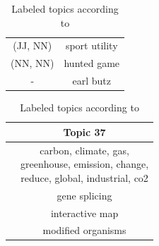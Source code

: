 {\begin{table}
\begin{minipage}[t]{0.5\textwidth}
\begin{tabular}{c|c}
			\hline
			(JJ, NN) & sport utility \\
			(NN, NN) & hunted game   \\
			-& earl butz	\\
		\end{tabular}
	\end{minipage}
	\hfill\hfill
	\begin{minipage}[t]{0.5\textwidth}
		\begin{tabular}{c|c}
			&Topic 37\\
			\hline
			\hline
			& \thead{carbon, climate, gas,\\ 	greenhouse, emission, change,\\ 	reduce, 	global, 	industrial, 	co2} \\
			\hline
			& gene splicing  \\
			& interactive map   \\
			& modified organisms\\
		\end{tabular}
	\end{minipage}
	\label{tab: labeled only intrinsic}
	\caption[Labeled topics according to \cite{Mei2007}]{Labeled topics according to \cite{Mei2007}}
\end{table}

}
